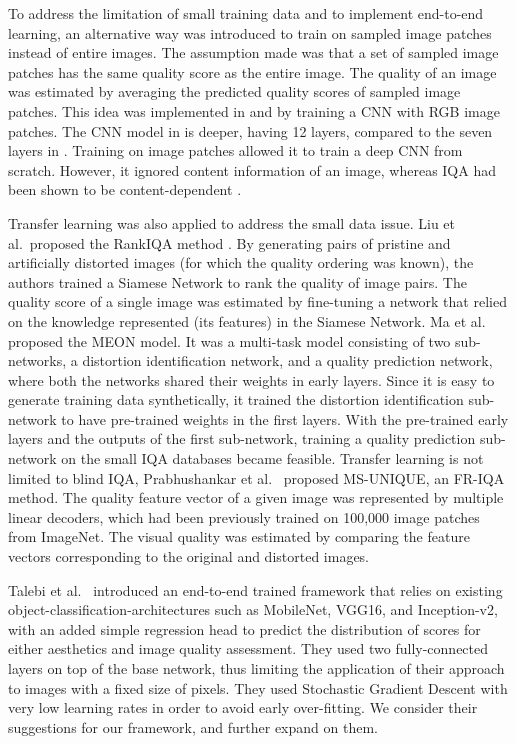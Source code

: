\documentclass[10pt,journal,compsoc]{IEEEtran}
\begin{document}
To address the limitation of small training data and to implement end-to-end learning, an alternative way was introduced to train on sampled image patches instead of entire images. The assumption made was that a set of sampled image patches has the same quality score as the entire image. The quality of an image was estimated by averaging the predicted quality scores of sampled image patches. This idea was implemented in \cite{conv1} and \cite{boss} by training a CNN with  RGB image patches. The CNN model in \cite{boss} is deeper, having 12 layers, compared to the seven layers in \cite{conv1}. Training on image patches allowed it to train a deep CNN from scratch. However, it ignored content information of an image, whereas IQA had been shown to be content-dependent \cite{siahaan2016does}.


Transfer learning was also applied to address the small data issue. 
Liu et al.\ proposed the RankIQA method \cite{Liu_2017_ICCV}. By generating pairs of pristine and artificially distorted images (for which the quality ordering was known), the authors trained a Siamese Network to rank the quality of image pairs. The quality score of a single image was estimated by fine-tuning a network that relied on the knowledge represented (its features) in the Siamese Network. Ma et al.\ \cite{ma2018end} proposed the MEON model. It was a multi-task model consisting of two sub-networks, a distortion identification network, and a quality prediction network, where both the networks shared their weights in early layers. Since it is easy to generate training data synthetically, it trained the distortion identification sub-network to have pre-trained weights in the first layers. With the pre-trained early layers and the outputs of the first sub-network, training a quality prediction sub-network on the small IQA databases became feasible.
Transfer learning is not limited to blind IQA, Prabhushankar et al.~\cite{prabhushankar2017ms} proposed MS-UNIQUE, an FR-IQA method. The quality feature vector of a given image was represented by multiple linear decoders, which had been previously trained on 100,000 image patches from ImageNet. The visual quality was estimated by comparing the feature vectors corresponding to the original and distorted images.

Talebi et al.\ \cite{talebi_nima_2017} introduced an end-to-end trained framework that relies on existing object-classification-architectures such as MobileNet, VGG16, and Inception-v2, with an added simple regression head to predict the distribution of scores for either aesthetics and image quality assessment. They used two fully-connected layers on top of the base network, thus limiting the application of their approach to images with a fixed size of  pixels. They used Stochastic Gradient Descent with very low learning rates in order to avoid early over-fitting. We consider their suggestions for our framework, and further expand on them.
\end{document}
